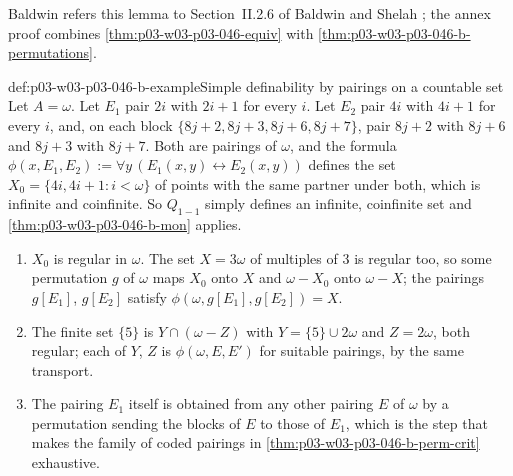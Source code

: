 Baldwin refers this lemma to Section~II.2.6 of Baldwin and Shelah
\cite[p.~451]{Baldwin1985DSOQ}; the annex proof combines
\cref{thm:p03-w03-p03-046-equiv} with
\cref{thm:p03-w03-p03-046-b-permutations}.

\begin{hbexample}{def:p03-w03-p03-046-b-example}{Simple definability by pairings on a countable set}
Let \(A=\omega\). Let \(E_1\) pair \(2i\) with \(2i+1\) for every \(i\).
Let \(E_2\) pair \(4i\) with \(4i+1\) for every \(i\), and, on each block
\(\{8j+2,8j+3,8j+6,8j+7\}\), pair \(8j+2\) with \(8j+6\) and \(8j+3\) with
\(8j+7\). Both are pairings of \(\omega\), and the formula
\(\phi(x,E_1,E_2):=\forall y\,(E_1(x,y)\leftrightarrow E_2(x,y))\)
defines the set \(X_0=\{4i,4i+1:i<\omega\}\) of points with the same
partner under both, which is infinite and coinfinite. So \(Q_{1-1}\)
simply defines an infinite, coinfinite set and
\cref{thm:p03-w03-p03-046-b-mon} applies.
\begin{enumerate}
  \item \(X_0\) is regular in \(\omega\). The set \(X=3\omega\) of
        multiples of \(3\) is regular too, so some permutation \(g\) of
        \(\omega\) maps \(X_0\) onto \(X\) and \(\omega-X_0\) onto
        \(\omega-X\); the pairings \(g[E_1]\), \(g[E_2]\) satisfy
        \(\phi(\omega,g[E_1],g[E_2])=X\).
  \item The finite set \(\{5\}\) is \(Y\cap(\omega-Z)\) with \(Y=\{5\}\cup
        2\omega\) and \(Z=2\omega\), both regular; each of \(Y\), \(Z\) is
        \(\phi(\omega,E,E')\) for suitable pairings, by the same transport.
  \item The pairing \(E_1\) itself is obtained from any other pairing
        \(E\) of \(\omega\) by a permutation sending the blocks of \(E\) to
        those of \(E_1\), which is the step that makes the family of
        coded pairings in \cref{thm:p03-w03-p03-046-b-perm-crit} exhaustive.
\end{enumerate}
\end{hbexample}


